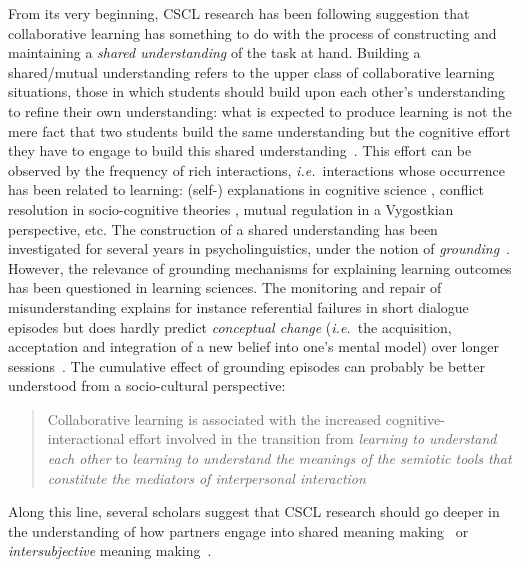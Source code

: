 \documentclass[twocolumn]{article}
\newcommand{\ie}{{\textit{i.e.\ }}}
\begin{document}
From its very beginning, CSCL research has been following
\citet{roschelle1995construction} suggestion that collaborative learning has
something to do with the process of constructing and maintaining a \emph{shared
understanding} of the task at hand. Building a shared/mutual understanding
refers to the upper class of collaborative learning situations, those in which
students should build upon each other's understanding to refine their own
understanding: what is expected to produce learning is not the mere fact that
two students build the same understanding but the cognitive effort they have to
engage to build this shared understanding~\citep{schwartz1995emergence}. This
effort can be observed by the frequency of rich interactions, \ie interactions
whose occurrence has been related to learning: (self-) explanations in cognitive
science  , conflict resolution in
socio-cognitive theories ,
mutual regulation  in a Vygostkian perspective, etc. The
construction of a shared understanding has been investigated for several years
in psycholinguistics, under the  notion of
\emph{grounding}~\citep{clark1986referring}. However, the relevance of grounding
mechanisms for explaining learning outcomes has been questioned in learning
sciences. The monitoring and repair of misunderstanding explains for instance
referential failures in short dialogue episodes but does hardly predict
\emph{conceptual change} (\ie the acquisition, acceptation and integration of a
new belief into one's mental model) over longer
sessions~\cite{dillenbourg2006sharing}. The cumulative effect of grounding
episodes can probably be better understood from a socio-cultural perspective:

\begin{quote}
Collaborative learning is associated with the increased
cognitive-interactional effort involved in the transition from \emph{learning to
understand each other} to \emph{learning to understand the meanings of the semiotic
tools that constitute the mediators of interpersonal
interaction}~\citep{baker1999role}
\end{quote}

Along this line, several scholars suggest that CSCL research should go deeper in
the understanding of how partners engage into shared meaning
making~\citep{stahl2007meaning} or \emph{intersubjective} meaning
making~\citep{suthers2006technology}.
\end{document}
